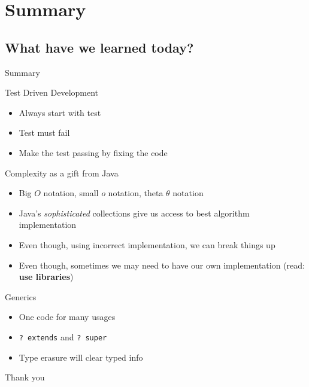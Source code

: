 \documentclass{beamer}
\begin{document}
\section{Summary}
\subsection{What have we learned today?}

\begin{frame}[c]{ }
    \centering
    Summary
\end{frame}

\begin{frame}{Test Driven Development}

    \begin{itemize}
        \item Always start with test \pause
        \item Test must fail \pause
        \item Make the test passing by fixing the code \pause
    \end{itemize}
\end{frame}

\begin{frame}{Complexity as a gift from Java}

    \begin{itemize}
        \item Big $O$ notation, small $o$ notation, theta $\theta$ notation \pause
        \item Java's \textit{sophisticated} collections give us access to best algorithm implementation \pause
        \item Even though, using incorrect implementation, we can break things up \pause
        \item Even though, sometimes we may need to have our own implementation (read: \textbf{use libraries})
    \end{itemize}
\end{frame}

\begin{frame}{Generics}

    \begin{itemize}
        \item One code for many usages
        \item \texttt{? extends} and \texttt{? super}
        \item Type erasure will clear typed info
    \end{itemize}
\end{frame}

\begin{frame}[c]{ }
    \centering
    Thank you
\end{frame}
\end{document}
